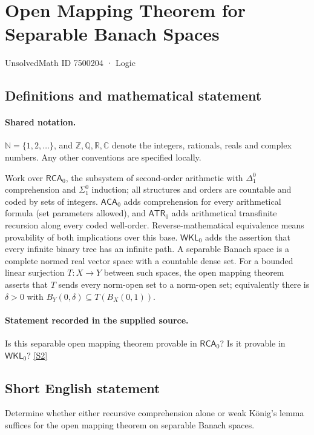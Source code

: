 \documentclass[11pt]{article}
\newcommand{\sref}[2]{\hyperlink{source:#1:#2}{[S#2]}}
\begin{document}
\setcounter{section}{7500203}
\section{Open Mapping Theorem for Separable Banach Spaces}\label{7500204}
{\small\sffamily UnsolvedMath ID 7500204 · Logic}
\subsection{Definitions and mathematical statement}

\paragraph{Shared notation.}$\mathbb N=\{1,2,\ldots\}$, and $\mathbb Z,\mathbb Q,\mathbb R,\mathbb C$ denote the integers, rationals, reals and complex numbers. Any other conventions are specified locally.


Work over $\mathsf{RCA}_0$, the subsystem of second-order arithmetic with $\Delta^0_1$ comprehension and $\Sigma^0_1$ induction; all structures and orders are countable and coded by sets of integers. $\mathsf{ACA}_0$ adds comprehension for every arithmetical formula (set parameters allowed), and $\mathsf{ATR}_0$ adds arithmetical transfinite recursion along every coded well-order. Reverse-mathematical equivalence means provability of both implications over this base. $\mathsf{WKL}_0$ adds the assertion that every infinite binary tree has an infinite path. A separable Banach space is a complete normed real vector space with a countable dense set. For a bounded linear surjection $T:X\to Y$ between such spaces, the open mapping theorem asserts that $T$ sends every norm-open set to a norm-open set; equivalently there is $\delta>0$ with $B_Y(0,\delta)\subseteq T(B_X(0,1))$.
\paragraph{Statement recorded in the supplied source.}
Is this separable open mapping theorem provable in $\mathsf{RCA}_0$? Is it provable in $\mathsf{WKL}_0$? \sref{7500204}{2}
\subsection{Short English statement}
Determine whether either recursive comprehension alone or weak König's lemma suffices for the open mapping theorem on separable Banach spaces.
\end{document}
